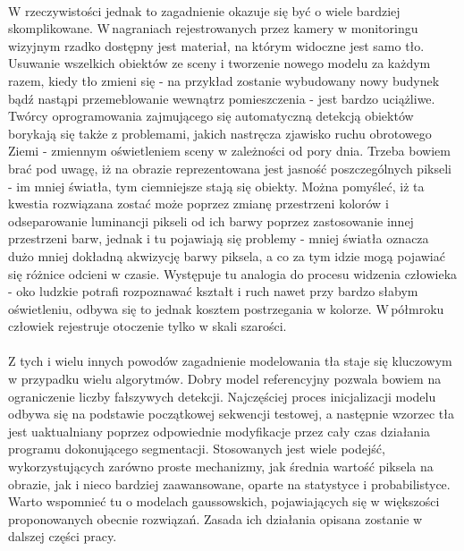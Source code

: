 \paragraph{}
W rzeczywistości jednak to zagadnienie okazuje się być o wiele bardziej skomplikowane. W\,nagraniach rejestrowanych przez kamery w monitoringu wizyjnym rzadko dostępny jest materiał, na którym widoczne jest samo tło. Usuwanie wszelkich obiektów ze sceny i tworzenie nowego modelu za każdym razem, kiedy tło zmieni się - na przykład zostanie wybudowany nowy budynek bądź nastąpi przemeblowanie wewnątrz pomieszczenia - jest bardzo uciążliwe. Twórcy oprogramowania zajmującego się automatyczną detekcją obiektów borykają się także z problemami, jakich nastręcza zjawisko ruchu obrotowego Ziemi - zmiennym oświetleniem sceny w zależności od pory dnia. Trzeba bowiem brać pod uwagę, iż na obrazie reprezentowana jest jasność poszczególnych pikseli - im mniej światła, tym ciemniejsze stają się obiekty. Można pomyśleć, iż ta kwestia rozwiązana zostać może poprzez zmianę przestrzeni kolorów i odseparowanie luminancji pikseli od ich barwy poprzez zastosowanie innej przestrzeni barw, jednak i tu pojawiają się problemy - mniej światła oznacza dużo mniej dokładną akwizycję barwy piksela, a co za tym idzie mogą pojawiać się różnice odcieni w czasie. Występuje tu analogia do procesu widzenia człowieka - oko ludzkie potrafi rozpoznawać kształt i ruch nawet przy bardzo słabym oświetleniu, odbywa się to jednak kosztem postrzegania w kolorze. W\,półmroku człowiek rejestruje otoczenie tylko w skali szarości.
\paragraph{}
Z tych i wielu innych powodów zagadnienie modelowania tła staje się kluczowym w przypadku wielu algorytmów. Dobry model referencyjny pozwala bowiem na ograniczenie liczby fałszywych detekcji. Najczęściej proces inicjalizacji modelu odbywa się na podstawie początkowej sekwencji testowej, a następnie wzorzec tła jest uaktualniany poprzez odpowiednie modyfikacje przez cały czas działania programu dokonującego segmentacji. Stosowanych jest wiele podejść, wykorzystujących zarówno proste mechanizmy, jak średnia wartość piksela na obrazie, jak i nieco bardziej zaawansowane, oparte na statystyce i probabilistyce. Warto wspomnieć tu o modelach gaussowskich, pojawiających się w większości proponowanych obecnie rozwiązań. Zasada ich działania opisana zostanie w dalszej części pracy.
